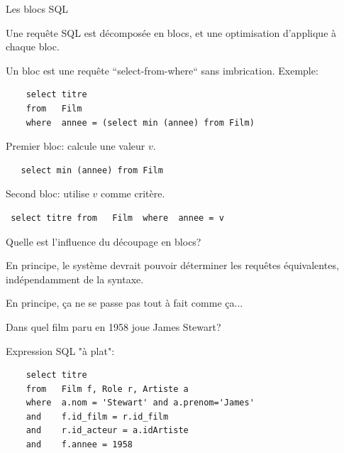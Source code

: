 \begin{frame}[fragile]{Les blocs SQL}

Une requête SQL est décomposée en blocs, et une optimisation d'applique
à chaque bloc.

\vfill

Un bloc est une requête ``select-from-where``
sans imbrication. Exemple:

\vfill

\begin{verbatim}
    select titre
    from   Film
    where  annee = (select min (annee) from Film)
\end{verbatim}

\vfill
Premier bloc: calcule une valeur $v$.
\begin{verbatim}
   select min (annee) from Film
\end{verbatim}

\vfill
Second bloc: utilise $v$ comme critère.
\begin{verbatim}
 select titre from   Film  where  annee = v
\end{verbatim}

\end{frame}

\begin{frame}[fragile]{Quelle est l'influence du découpage en blocs?}

En principe, le système devrait pouvoir déterminer les requêtes équivalentes,
indépendamment de la syntaxe.

\vfill

En principe, ça ne se passe pas tout à fait comme ça...

\vfill

Dans quel film paru en 1958 joue  James Stewart? 

\vfill

Expression SQL "à plat":

\vfill

\begin{verbatim}
    select titre
    from   Film f, Role r, Artiste a
    where  a.nom = 'Stewart' and a.prenom='James'
    and    f.id_film = r.id_film
    and    r.id_acteur = a.idArtiste
    and    f.annee = 1958
\end{verbatim}

\end{frame}



